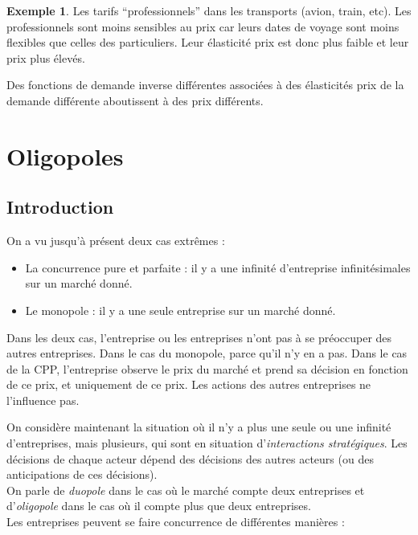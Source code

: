 \documentclass[
]{book}
\providecommand{\tightlist}{%
  \setlength{\itemsep}{0pt}\setlength{\parskip}{0pt}}
\theoremstyle{definition}
\theoremstyle{definition}
\newtheorem{example}{Exemple}[chapter]
\theoremstyle{definition}
\theoremstyle{definition}
\theoremstyle{remark}
\begin{document}
\begin{example}
Les tarifs ``professionnels'' dans les transports (avion, train, etc).
Les professionnels sont moins sensibles au prix car leurs dates de voyage sont moins flexibles que celles des particuliers.
Leur élasticité prix est donc plus faible et leur prix plus élevés.
\end{example}

Des fonctions de demande inverse différentes associées à des élasticités prix de la demande différente aboutissent à des prix différents.

\hypertarget{oligopoles}{%
\chapter{Oligopoles}\label{oligopoles}}

\hypertarget{introduction}{%
\section{Introduction}\label{introduction}}

On a vu jusqu'à présent deux cas extrêmes :

\begin{itemize}
\tightlist
\item
  La concurrence pure et parfaite :
  il y a une infinité d'entreprise infinitésimales sur un marché donné.
\item
  Le monopole : il y a une seule entreprise sur un marché donné.
\end{itemize}

Dans les deux cas, l'entreprise ou les entreprises n'ont pas à se préoccuper des autres entreprises.
Dans le cas du monopole, parce qu'il n'y en a pas.
Dans le cas de la CPP, l'entreprise observe le prix du marché et prend sa décision en fonction de ce prix, et uniquement de ce prix.
Les actions des autres entreprises ne l'influence pas.

On considère maintenant la situation où il n'y a plus une seule ou une infinité d'entreprises, mais plusieurs, qui sont en situation d'\emph{interactions stratégiques}.
Les décisions de chaque acteur dépend des décisions des autres acteurs (ou des anticipations de ces décisions).\\
On parle de \emph{duopole} dans le cas où le marché compte deux entreprises et d'\emph{oligopole} dans le cas où il compte plus que deux entreprises.\\
Les entreprises peuvent se faire concurrence de différentes manières :
\end{document}
